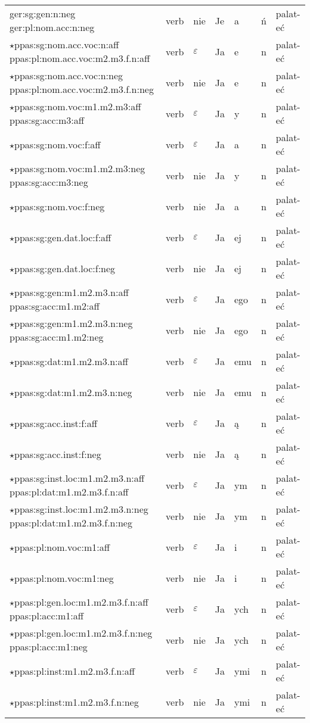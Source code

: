 \documentclass{article}
\begin{document}
\begin{longtable}{p{7cm}|l|l|l|l|l|l}
ger:sg:gen:n:neg ger:pl:nom.acc:n:neg & verb & nie & Je & a & ń & palat-eć\\
$\star$ppas:sg:nom.acc.voc:n:aff ppas:pl:nom.acc.voc:m2.m3.f.n:aff & verb & $\varepsilon$ & Ja & e & n & palat-eć\\
$\star$ppas:sg:nom.acc.voc:n:neg ppas:pl:nom.acc.voc:m2.m3.f.n:neg & verb & nie & Ja & e & n & palat-eć\\
$\star$ppas:sg:nom.voc:m1.m2.m3:aff ppas:sg:acc:m3:aff & verb & $\varepsilon$ & Ja & y & n & palat-eć\\
$\star$ppas:sg:nom.voc:f:aff & verb & $\varepsilon$ & Ja & a & n & palat-eć\\
$\star$ppas:sg:nom.voc:m1.m2.m3:neg ppas:sg:acc:m3:neg & verb & nie & Ja & y & n & palat-eć\\
$\star$ppas:sg:nom.voc:f:neg & verb & nie & Ja & a & n & palat-eć\\
$\star$ppas:sg:gen.dat.loc:f:aff & verb & $\varepsilon$ & Ja & ej & n & palat-eć\\
$\star$ppas:sg:gen.dat.loc:f:neg & verb & nie & Ja & ej & n & palat-eć\\
$\star$ppas:sg:gen:m1.m2.m3.n:aff ppas:sg:acc:m1.m2:aff & verb & $\varepsilon$ & Ja & ego & n & palat-eć\\
$\star$ppas:sg:gen:m1.m2.m3.n:neg ppas:sg:acc:m1.m2:neg & verb & nie & Ja & ego & n & palat-eć\\
$\star$ppas:sg:dat:m1.m2.m3.n:aff & verb & $\varepsilon$ & Ja & emu & n & palat-eć\\
$\star$ppas:sg:dat:m1.m2.m3.n:neg & verb & nie & Ja & emu & n & palat-eć\\
$\star$ppas:sg:acc.inst:f:aff & verb & $\varepsilon$ & Ja & ą & n & palat-eć\\
$\star$ppas:sg:acc.inst:f:neg & verb & nie & Ja & ą & n & palat-eć\\
$\star$ppas:sg:inst.loc:m1.m2.m3.n:aff ppas:pl:dat:m1.m2.m3.f.n:aff & verb & $\varepsilon$ & Ja & ym & n & palat-eć\\
$\star$ppas:sg:inst.loc:m1.m2.m3.n:neg ppas:pl:dat:m1.m2.m3.f.n:neg & verb & nie & Ja & ym & n & palat-eć\\
$\star$ppas:pl:nom.voc:m1:aff & verb & $\varepsilon$ & Ja & i & n & palat-eć\\
$\star$ppas:pl:nom.voc:m1:neg & verb & nie & Ja & i & n & palat-eć\\
$\star$ppas:pl:gen.loc:m1.m2.m3.f.n:aff ppas:pl:acc:m1:aff & verb & $\varepsilon$ & Ja & ych & n & palat-eć\\
$\star$ppas:pl:gen.loc:m1.m2.m3.f.n:neg ppas:pl:acc:m1:neg & verb & nie & Ja & ych & n & palat-eć\\
$\star$ppas:pl:inst:m1.m2.m3.f.n:aff & verb & $\varepsilon$ & Ja & ymi & n & palat-eć\\
$\star$ppas:pl:inst:m1.m2.m3.f.n:neg & verb & nie & Ja & ymi & n & palat-eć\\
\end{longtable}
\end{document}
